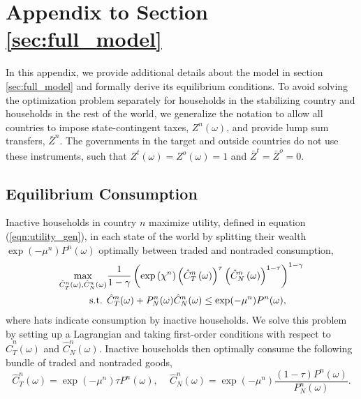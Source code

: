 \section{Appendix to Section \ref{sec:full_model}}

In this appendix, we provide additional details about the model in
section \ref{sec:full_model} and formally derive its equilibrium
conditions. To avoid solving the optimization problem
separately for households in the stabilizing country and households in
the rest of the world, we generalize the notation to allow all
countries to impose state-contingent taxes, $Z^n(\omega)$, and provide
lump sum transfers, $\bar{Z}^n$. The governments in the target and
outside countries do not use these instruments, such that
$Z^t(\omega)=Z^o(\omega) = 1$ and $\bar{Z}^t =\bar{Z}^o= 0$.

\subsection{Equilibrium Consumption
  \label{Appendix_Inactive} \label{Appendix_Active}}

Inactive households in country $n$ maximize utility, defined in
equation (\ref{eqn:utility_gen}), in each state of the world by
splitting their wealth $\exp(-\mu^n) P^n(\omega)$ optimally between
traded and nontraded consumption,
\begin{align*}
  \max_{\hat{C}_T^n\left( \omega \right), \hat{C}_N^n\left( \omega\right)}
  & \frac{1}{1 - \gamma}  
    \left(\exp\left( \chi^n\right) \left( \hat{C}_T^n \left( \omega \right) \right)^{\tau} 
    \left( \hat{ C }_N^n\left( \omega \right) \right)^{1 - \tau} \right)^{1 - \gamma} \\
  \text{ s.t. }
  & \hat{C}_T^n ( \omega ) + P^n_{N}(\omega) \hat{C}_N^n ( \omega ) \le 
    \exp(-\mu^n)P^n(\omega), \notag
\end{align*}
where hats indicate consumption by inactive households. We solve this
problem by setting up a Lagrangian and taking first-order conditions
with respect to $\hat{C}_T^n( \omega )$ and $\hat{C}_N^n ( \omega )$.
Inactive households then optimally consume the following bundle of
traded and nontraded goods,
\begin{equation*}
  \hat{C}_{T}^n(\omega) = \exp (- \mu^n) \tau P^n(\omega) \text{, }  \quad
  \hat{C}_{N}^n(\omega) = \exp ( - \mu^n) \frac{(1 - \tau)P^n(\omega) }{P_{N}^n(\omega) }.
\end{equation*}

